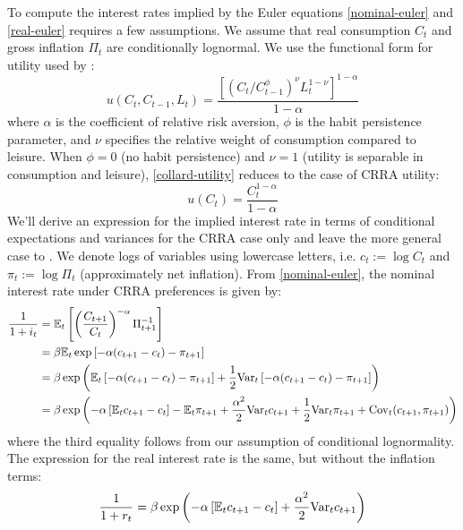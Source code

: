 To compute the interest rates implied by the Euler equations \eqref{nominal-euler} and \eqref{real-euler} requires a few assumptions. We assume that real consumption $C_t$ and gross inflation $\Pi_t$ are conditionally lognormal. We use the functional form for utility used by \cite{collard11}:
\begin{equation}
\label{collard-utility}
u(C_t, C_{t-1}, L_t) = \frac{[(C_t/C_{t-1}^\phi)^\nu L_t^{1-\nu}]^{1-\alpha}}{1-\alpha}
\end{equation}
where $\alpha$ is the coefficient of relative risk aversion, $\phi$ is the habit persistence parameter, and $\nu$ specifies the relative weight of consumption compared to leisure. When $\phi = 0$ (no habit persistence) and $\nu = 1$ (utility is separable in consumption and leisure), \eqref{collard-utility} reduces to the case of CRRA utility: $$u(C_t) = \frac{C_t^{1-\alpha}}{1-\alpha}$$
We'll derive an expression for the implied interest rate in terms of conditional expectations and variances for the CRRA case only and leave the more general case to \cite{collard11}. We denote logs of variables using lowercase letters, i.e. $c_t := \log C_t$ and $\pi_t := \log \Pi_t$ (approximately net inflation). From \eqref{nominal-euler}, the nominal interest rate under CRRA preferences is given by:
\begin{align*}
\frac{1}{1 + i_t} &= \mathbb{E}_t \left[  \left( \frac{C_{t+1}}{C_t} \right)^{-\alpha} \Pi_{t+1}^{-1}  \right] \\
  &= \beta \mathbb{E}_t \exp \left[  -\alpha(c_{t+1} - c_t) - \pi_{t+1}  \right] \\
  &= \beta \exp \left(  \mathbb{E}_t \left[  -\alpha(c_{t+1} - c_t) - \pi_{t+1}  \right] + \frac{1}{2} \mathrm{Var}_t \left[  -\alpha(c_{t+1} - c_t) - \pi_{t+1}  \right]  \right) \\
  &= \beta \exp \left(  -\alpha \left[  \mathbb{E}_t c_{t+1} - c_t  \right] - \mathbb{E}_t \pi_{t+1}  + \frac{\alpha^2}{2} \mathrm{Var}_t c_{t+1} + \frac{1}{2} \mathrm{Var}_t \pi_{t+1} + \mathrm{Cov}_t(c_{t+1}, \pi_{t+1})  \right)
\end{align*}
where the third equality follows from our assumption of conditional lognormality. The expression for the real interest rate is the same, but without the inflation terms: $$\frac{1}{1 + r_t} = \beta \exp \left(  -\alpha \left[  \mathbb{E}_t c_{t+1} - c_t  \right] + \frac{\alpha^2}{2} \mathrm{Var}_t c_{t+1}  \right)$$

